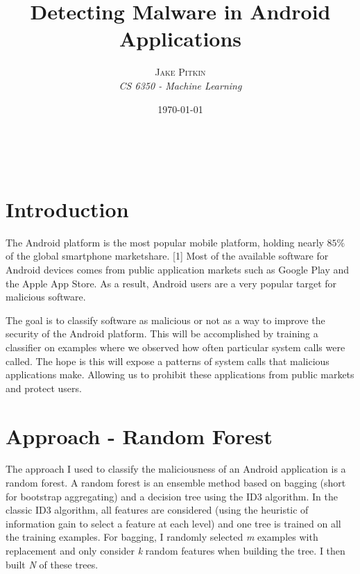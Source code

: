 \documentclass[a4paper, 11pt]{article} %
\title{\textbf{Detecting Malware in Android Applications}\\ %
} %
\author{\textsc{Jake Pitkin} %
\\{\textit{CS 6350 - Machine Learning}}} %
\date{\today} %
\makeatletter
\renewcommand{\maketitle}{ %
\begin{flushright} %
{\LARGE\@title} %

\vspace{50pt} %

{\large\@author} %
\\\@date %

\vspace{40pt} %
\end{flushright}
}
\makeatother
\begin{document}
\maketitle %




\section*{Introduction}

The Android platform is the most popular mobile platform, holding nearly $85\%$ of the global smartphone marketshare. [1] Most of the available software for Android devices comes from public application markets such as Google Play and the Apple App Store. As a result, Android users are a very popular target for malicious software. 

The goal is to classify software as malicious or not as a way to improve the security of the Android platform. This will be accomplished by training a classifier on examples where we observed how often particular system calls were called. The hope is this will expose a patterns of system calls that malicious applications make. Allowing us to prohibit these applications from public markets and protect users.
 

\section*{Approach - Random Forest}
The approach I used to classify the maliciousness of an Android application is a random forest. A random forest is an ensemble method based on bagging (short for bootstrap aggregating) and a decision tree using the ID3 algorithm. In the classic ID3 algorithm, all features are considered (using the heuristic of information gain to select a feature at each level) and one tree is trained on all the training examples. For bagging, I randomly selected \textit{m} examples with replacement and only consider \textit{k} random features when building the tree. I then built \textit{N} of these trees. 
\end{document}
